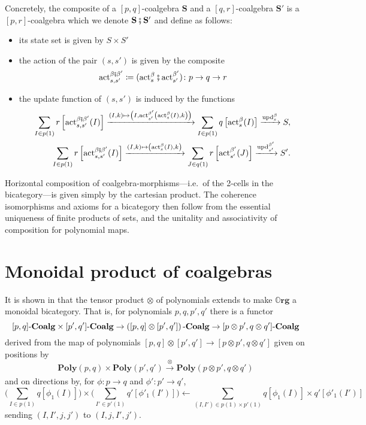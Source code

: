 \documentclass[11pt, one side, article]{memoir}
\theoremstyle{definition}
\theoremstyle{plain}
\newcommand{\Cat}[1]{\mathbf{#1}}%
\newcommand{\then}{\mathbin{\fatsemi}}
\newcommand{\To}[2][]{\xrightarrow[#1]{#2}}
\newcommand{\fromm}{\longleftarrow}
\newcommand{\tn}[1]{\textnormal{#1}}
\newcommand{\act}{\tn{act}}
\newcommand{\upd}{\tn{upd}}
\newcommand{\poly}{\Cat{Poly}}
\newcommand{\0}{\textsf{0}}
\newcommand{\1}{\tn{\textsf{1}}}
\newcommand{\coalg}{\tn{-}\Cat{Coalg}}
\newcommand{\org}{{\mathbb{O}\Cat{rg}}}
\renewcommand{\S}{{\Cat{S}}}
\begin{document}
Concretely, the composite of a $[p,q]$-coalgebra $\S$ and a $[q,r]$-coalgebra $\S'$ is a $[p,r]$-coalgebra which we denote $\S\then\S'$  and define as follows:
\begin{itemize}
	\item its state set is given by $S \times S'$
	\item the action of the pair $(s,s')$ is given by the composite 
\[\act^{\beta\then\beta'}_{s,s'}\coloneqq(\act^\beta_s\then\act^{\beta'}_{s'})\colon p \to q \to r\]
	\item the update function of $(s,s')$ is induced by the functions
\begin{align*}
	\sum_{I \in p(1)} r\left[\act^{\beta\then\beta'}_{s,s'}(I)\right] \To{(I,k)\mapsto\left(I,\act^{\beta'}_{s'}\left(\act^\beta_s(I),k\right)\right)} \sum_{I \in p(1)} q\left[\act^\beta_s(I)\right] \To{\upd^\beta_s} S,\\
	\sum_{I \in p(1)} r\left[\act^{\beta\then\beta'}_{s,s'}(I)\right] \To{(I,k)\mapsto\left(\act^\beta_s(I),k\right)} \sum_{J \in q(1)} r\left[\act^{\beta'}_{s'}(J)\right] \To{\upd^{\beta'}_{s'}} S'.
\end{align*}%
\end{itemize}

Horizontal composition of coalgebra-morphisms---i.e.\ of the 2-cells in the bicategory---is given simply by the cartesian product. The coherence isomorphisms and axioms for a bicategory then follow from the essential uniqueness of finite products of sets, and the unitality and associativity of composition for polynomial maps.%



\section{Monoidal product of coalgebras}


It is shown in \cite[Proposition 2.13]{spivak2021learners} that the tensor product $\otimes$ of polynomials extends to make $\org$ a monoidal bicategory. That is, for polynomials $p,q,p',q'$ there is a functor
\[[p,q]\coalg \times [p',q']\coalg \to \left([p,q] \otimes [p',q']\right)\coalg \to [p \otimes p',q \otimes q']\coalg\]
derived from the map of polynomials $[p,q] \otimes [p',q'] \to [p {\otimes} p',q {\otimes} q']$ given on positions by 
\[\poly(p,q) \times \poly(p',q') \To{\otimes} \poly(p \otimes p',q \otimes q')\]
and on directions by, for $\phi\colon p \to q$ and $\phi'\colon p' \to q'$,
\[\bigg(\sum_{I \in p(1)} q[\phi_1(I)]\bigg) \times \bigg(\sum_{I' \in p'(1)} q'[\phi'_1(I')]\bigg) \fromm \sum_{(I,I') \in p(1) \times p'(1)} q[\phi_1(I)] \times q'[\phi'_1(I')]\]
sending $(I,I',j,j')$ to $(I,j,I',j')$.
\end{document}
